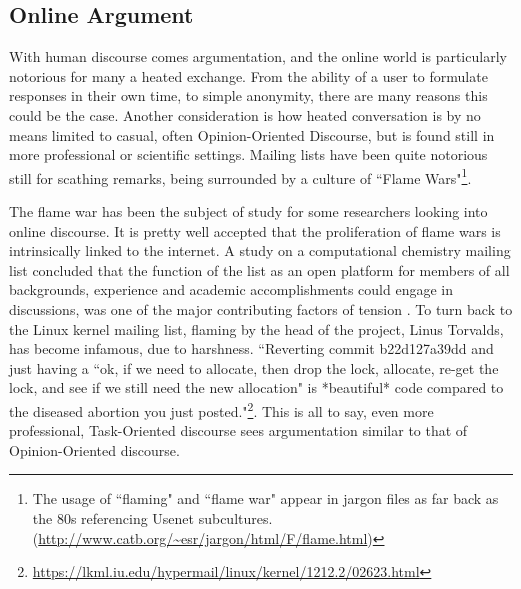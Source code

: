 \documentclass{article}
\begin{document}
\subsection{Online Argument}
With human discourse comes argumentation, and the online world is particularly notorious for many a heated exchange. From the ability of a user to formulate responses in their own time, to simple anonymity, there are many reasons this could be the case. Another consideration is how heated conversation is by no means limited to casual, often Opinion-Oriented Discourse, but is found still in more professional or scientific settings. Mailing lists have been quite notorious still for scathing remarks, being surrounded by a culture of ``Flame Wars"\footnote{The usage of ``flaming" and ``flame war" appear in jargon files as far back as the 80s referencing Usenet subcultures. (\url{http://www.catb.org/~esr/jargon/html/F/flame.html})}. 

The flame war has been the subject of study for some researchers looking into online discourse. It is pretty well accepted that the proliferation of flame wars is intrinsically linked to the internet. A study on a computational chemistry mailing list concluded that the function of the list as an open platform for members of all backgrounds, experience and academic accomplishments could engage in discussions, was one of the major contributing factors of tension \cite[p. 53]{MLA}. To turn back to the Linux kernel mailing list, flaming by the head of the project, Linus Torvalds, has become infamous, due to harshness. ``Reverting commit b22d127a39dd and just having a ``ok, if we need to allocate, then drop the lock, allocate, re-get the lock, and see if we still need the new allocation" is *beautiful* code compared to the diseased abortion you just posted."\footnote{\url{https://lkml.iu.edu/hypermail/linux/kernel/1212.2/02623.html}}. This is all to say, even more professional, Task-Oriented discourse sees argumentation similar to that of Opinion-Oriented discourse. 
\end{document}
